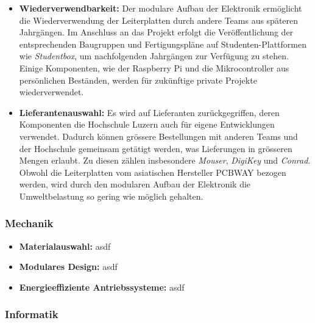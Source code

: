 \documentclass[../../main.tex]{subfiles} %
\begin{document}
\begin{itemize}
  \item \textbf{Wiederverwendbarkeit:} Der modulare Aufbau der Elektronik ermöglicht die
        Wiederverwendung der Leiterplatten durch andere Teams aus späteren Jahrgängen. Im 
        Anschluss an das Projekt erfolgt die Veröffentlichung der entsprechenden Baugruppen 
        und Fertigungspläne auf Studenten-Plattformen wie \textit{Studentbox}, um nachfolgenden 
        Jahrgängen zur Verfügung zu stehen. Einige Komponenten, wie der Raspberry Pi und 
        die Mikrocontroller aus persönlichen Beständen, werden für zukünftige private 
        Projekte wiederverwendet.

  \item \textbf{Lieferantenauswahl:} Es wird auf Lieferanten zurückgegriffen, deren Komponenten
        die Hochschule Luzern auch für eigene Entwicklungen verwendet. Dadurch können grössere Bestellungen mit
        anderen Teams und der Hochschule gemeinsam getätigt werden, was Lieferungen in grösseren Mengen erlaubt.
        Zu diesen zählen insbesondere \textit{Mouser}, \textit{DigiKey} und \textit{Conrad}.
        Obwohl die Leiterplatten vom asiatischen Hersteller PCBWAY bezogen werden, wird durch den modularen
        Aufbau der Elektronik die Umweltbelastung so gering wie möglich gehalten.
\end{itemize}

\subsubsection{Mechanik}

\begin{itemize}
  \item \textbf{Materialauswahl:} asdf
  \item \textbf{Modulares Design:} asdf
  \item \textbf{Energieeffiziente Antriebssysteme:} asdf
\end{itemize}

\subsubsection{Informatik}
\end{document}
